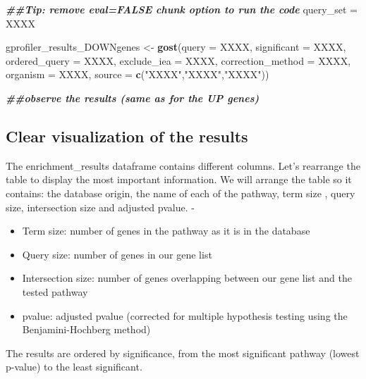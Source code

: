 \documentclass[
]{book}
\newenvironment{Shaded}{\begin{snugshade}}{\end{snugshade}}
\newcommand{\AttributeTok}[1]{\textcolor[rgb]{0.13,0.29,0.53}{#1}}
\newcommand{\DocumentationTok}[1]{\textcolor[rgb]{0.56,0.35,0.01}{\textbf{\textit{#1}}}}
\newcommand{\FunctionTok}[1]{\textcolor[rgb]{0.13,0.29,0.53}{\textbf{#1}}}
\newcommand{\NormalTok}[1]{#1}
\newcommand{\OtherTok}[1]{\textcolor[rgb]{0.56,0.35,0.01}{#1}}
\newcommand{\StringTok}[1]{\textcolor[rgb]{0.31,0.60,0.02}{#1}}
\providecommand{\tightlist}{%
  \setlength{\itemsep}{0pt}\setlength{\parskip}{0pt}}
\begin{document}
\begin{Shaded}
\begin{Highlighting}[]
\DocumentationTok{\#\#Tip: remove eval=FALSE chunk option to run the code}
\NormalTok{query\_set }\OtherTok{=}\NormalTok{ XXXX}

\NormalTok{gprofiler\_results\_DOWNgenes }\OtherTok{\textless{}{-}} \FunctionTok{gost}\NormalTok{(}\AttributeTok{query =}\NormalTok{ XXXX,}
                          \AttributeTok{significant =}\NormalTok{ XXXX,}
                          \AttributeTok{ordered\_query =}\NormalTok{ XXXX,}
                          \AttributeTok{exclude\_iea =}\NormalTok{ XXXX,}
                          \AttributeTok{correction\_method =}\NormalTok{ XXXX,}
                          \AttributeTok{organism =}\NormalTok{ XXXX,}
                          \AttributeTok{source =} \FunctionTok{c}\NormalTok{(}\StringTok{"XXXX"}\NormalTok{,}\StringTok{"XXXX"}\NormalTok{,}\StringTok{"XXXX"}\NormalTok{))}

\DocumentationTok{\#\#observe the results (same as for the UP genes)}
\end{Highlighting}
\end{Shaded}

\subsection{Clear visualization of the results}\label{clear-visualization-of-the-results}

The enrichment\_results dataframe contains different columns. Let's rearrange the table to display the most important information. We will arrange the table so it contains: the database origin, the name of each of the pathway, term size , query size, intersection size and adjusted pvalue. -

\begin{itemize}
\tightlist
\item
  Term size: number of genes in the pathway as it is in the database
\item
  Query size: number of genes in our gene list
\item
  Intersection size: number of genes overlapping between our gene list and the tested pathway
\item
  pvalue: adjusted pvalue (corrected for multiple hypothesis testing using the Benjamini-Hochberg method)
\end{itemize}

The results are ordered by significance, from the most significant pathway (lowest p-value) to the least significant.
\end{document}
